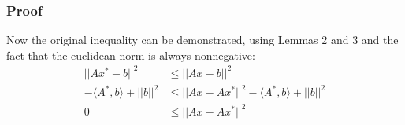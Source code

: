 \documentclass[12pt]{article}
\begin{document}
\subsubsection{Proof}
Now the original inequality can be demonstrated, using Lemmas 2 and 3 and the fact that the euclidean norm is always nonnegative:
\begin{align*}
||Ax^* - b||^2 &\le ||Ax - b||^2 \\
-\langle A^*, b \rangle + ||b||^2 &\le ||Ax - Ax^*||^2 - \langle A^*, b \rangle + ||b||^2 \\
0 &\le ||Ax - Ax^*||^2
\end{align*}
\end{document}
